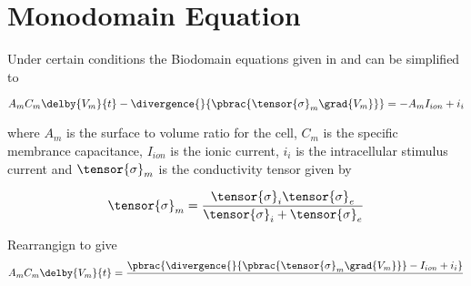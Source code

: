 \section{Monodomain Equation}
\label{sec:Monodomain}

Under certain conditions the Biodomain equations given in
 and  can be simplified to 

\begin{equation}
  A_{m}C_{m}\delby{V_{m}}{t}-\divergence{}{\pbrac{\tensor{\sigma}_{m}\grad{V_{m}}}}=-A_{m}I_{ion}+i_{i}
  \label{eqn:monodomain}
\end{equation}

where $A_{m}$ is the surface to volume ratio for the cell, $C_{m}$ is
the specific membrance capacitance, $I_{ion}$ is the ionic current, $i_{i}$ is the
intracellular stimulus current and $\tensor{\sigma}_{m}$ is the
conductivity tensor given by

\begin{equation}
  \tensor{\sigma}_{m}=\dfrac{\tensor{\sigma}_{i}\tensor{\sigma}_{e}}{\tensor{\sigma}_{i}+\tensor{\sigma}_{e}}
  \label{eqn:monodomainconductivity}
\end{equation}

Rearrangign  to give
\begin{equation}
  A_{m}C_{m}\delby{V_{m}}{t}=\dfrac{\pbrac{\divergence{}{\pbrac{\tensor{\sigma}_{m}\grad{V_{m}}}}-I_{ion}+i_{i}}}{}
\end{equation}
